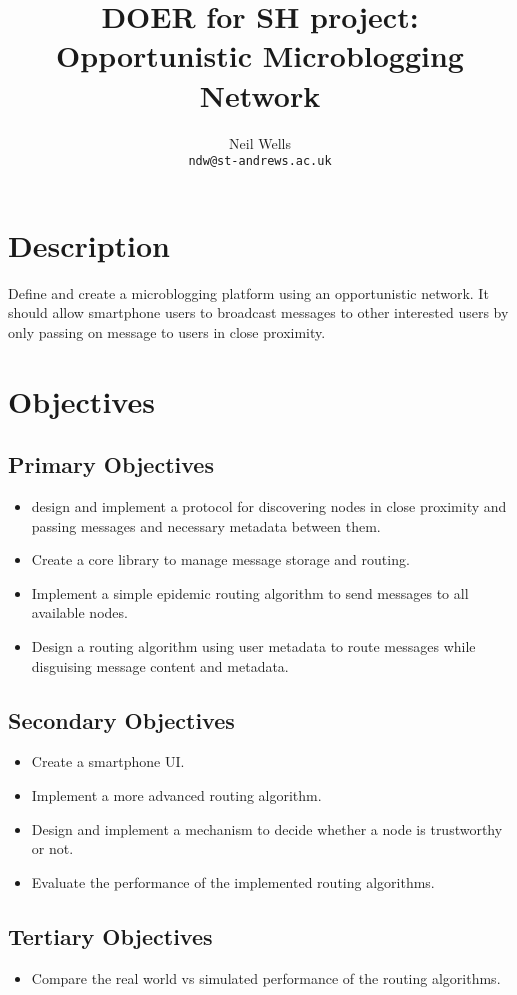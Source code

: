 \documentclass{article}
\title{\textbf{DOER for SH project: Opportunistic Microblogging Network}}
\author{Neil Wells\\
\texttt{ndw@st-andrews.ac.uk}}
\date{}
\begin{document}
\maketitle

\section*{Description}
Define and create a microblogging platform using an opportunistic network. It should allow smartphone users to broadcast messages to other interested users by only passing on message to users in close proximity.

\section*{Objectives}

\subsection*{Primary Objectives}
\begin{itemize}
\item design and implement a protocol for discovering nodes in close proximity and passing messages and necessary metadata between them.
\item Create a core library to manage message storage and routing.
\item Implement a simple epidemic routing algorithm to send messages to all available nodes.
\item Design a routing algorithm using user metadata to route messages while disguising message content and metadata.
\end{itemize}

\subsection*{Secondary Objectives}
\begin{itemize}
\item Create a smartphone UI.
\item Implement a more advanced routing algorithm.
\item Design and implement a mechanism to decide whether a node is trustworthy or not.
\item Evaluate the performance of the implemented routing algorithms.
\end{itemize}

\subsection*{Tertiary Objectives}
\begin{itemize}
\item Compare the real world vs simulated performance of the routing algorithms.
\end{itemize}
\end{document}
